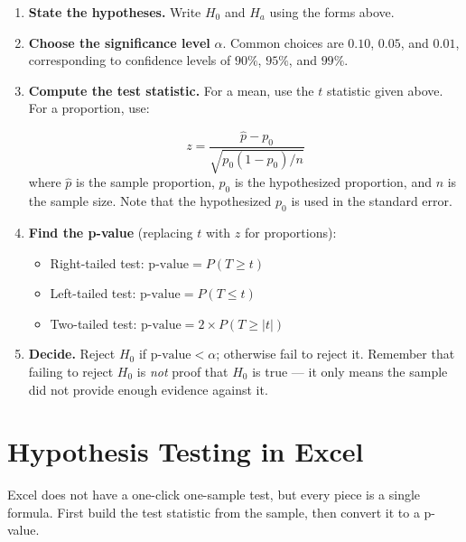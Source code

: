 \documentclass[
  11pt,
  letterpaper,
  DIV=11,
  numbers=noendperiod,
  oneside,
  open=any]{scrreprt}
\providecommand{\tightlist}{%
  \setlength{\itemsep}{0pt}\setlength{\parskip}{0pt}}\usepackage{longtable,booktabs,array}
\begin{document}
\begin{enumerate}
\def\labelenumi{\arabic{enumi}.}
\item
  \textbf{State the hypotheses.} Write \(H_0\) and \(H_a\) using the
  forms above.
\item
  \textbf{Choose the significance level} \(\alpha\). Common choices are
  \(0.10\), \(0.05\), and \(0.01\), corresponding to confidence levels
  of \(90\%\), \(95\%\), and \(99\%\).
\item
  \textbf{Compute the test statistic.} For a mean, use the \(t\)
  statistic given above. For a proportion, use:

  \begin{bsformula}

  \[z = \frac{\hat{p} - p_0}{\sqrt{p_0(1 - p_0)/n}}\] where \(\hat{p}\)
  is the sample proportion, \(p_0\) is the hypothesized proportion, and
  \(n\) is the sample size. Note that the hypothesized \(p_0\) is used
  in the standard error.

  \end{bsformula}
\item
  \textbf{Find the p-value} (replacing \(t\) with \(z\) for
  proportions):

  \begin{itemize}
  \tightlist
  \item
    Right-tailed test: \(\text{p-value} = P(T \geq t)\)
  \item
    Left-tailed test: \(\text{p-value} = P(T \leq t)\)
  \item
    Two-tailed test: \(\text{p-value} = 2 \times P(T \geq |t|)\)
  \end{itemize}
\item
  \textbf{Decide.} Reject \(H_0\) if \(\text{p-value} < \alpha\);
  otherwise fail to reject it. Remember that failing to reject \(H_0\)
  is \emph{not} proof that \(H_0\) is true --- it only means the sample
  did not provide enough evidence against it.
\end{enumerate}

\section{Hypothesis Testing in Excel}\label{hypothesis-testing-in-excel}

Excel does not have a one-click one-sample test, but every piece is a
single formula. First build the test statistic from the sample, then
convert it to a p-value.
\end{document}
